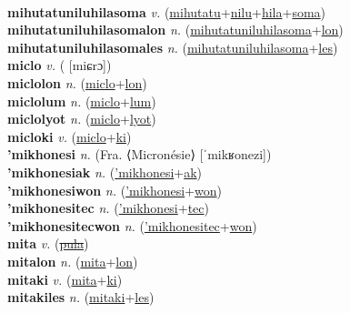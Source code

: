  \label{mihutatulon} \\
\textbf{mihutatuniluhilasoma} \textit{v.} (\hyperref[mihutatu]{mihutatu}+\hyperref[nilu]{nilu}+\hyperref[hila]{hila}+\hyperref[soma]{soma})
 \label{mihutatuniluhilasoma} \\
\textbf{mihutatuniluhilasomalon} \textit{n.} (\hyperref[mihutatuniluhilasoma]{mihutatuniluhilasoma}+\hyperref[lon]{lon})
 \label{mihutatuniluhilasomalon} \\
\textbf{mihutatuniluhilasomales} \textit{n.} (\hyperref[mihutatuniluhilasoma]{mihutatuniluhilasoma}+\hyperref[les]{les})
 \label{mihutatuniluhilasomales} \\
\textbf{miclo} \textit{v.} ( [miɕrɔ])
 \label{miclo} \\
\textbf{miclolon} \textit{n.} (\hyperref[miclo]{miclo}+\hyperref[lon]{lon})
 \label{miclolon} \\
\textbf{miclolum} \textit{n.} (\hyperref[miclo]{miclo}+\hyperref[lum]{lum})
 \label{miclolum} \\
\textbf{miclolyot} \textit{n.} (\hyperref[miclo]{miclo}+\hyperref[lyot]{lyot})
 \label{miclolyot} \\
\textbf{micloki} \textit{v.} (\hyperref[miclo]{miclo}+\hyperref[ki]{ki})
 \label{micloki} \\
\textbf{'mikhonesi} \textit{n.} (Fra. ⟨Micronésie⟩ [ˈmikʁonezi])
 \label{'mikhonesi} \\
\textbf{'mikhonesiak} \textit{n.} (\hyperref['mikhonesi]{'mikhonesi}+\hyperref[ak]{ak})
 \label{'mikhonesiak} \\
\textbf{'mikhonesiwon} \textit{n.} (\hyperref['mikhonesi]{'mikhonesi}+\hyperref[won]{won})
 \label{'mikhonesiwon} \\
\textbf{'mikhonesitec} \textit{n.} (\hyperref['mikhonesi]{'mikhonesi}+\hyperref[tec]{tec})
 \label{'mikhonesitec} \\
\textbf{'mikhonesitecwon} \textit{n.} (\hyperref['mikhonesitec]{'mikhonesitec}+\hyperref[won]{won})
 \label{'mikhonesitecwon} \\
\textbf{mita} \textit{v.} (\hyperref[pula]{\sout{pula}})
 \label{mita} \\
\textbf{mitalon} \textit{n.} (\hyperref[mita]{mita}+\hyperref[lon]{lon})
 \label{mitalon} \\
\textbf{mitaki} \textit{v.} (\hyperref[mita]{mita}+\hyperref[ki]{ki})
 \label{mitaki} \\
\textbf{mitakiles} \textit{n.} (\hyperref[mitaki]{mitaki}+\hyperref[les]{les})
 \label{mitakiles} \\
